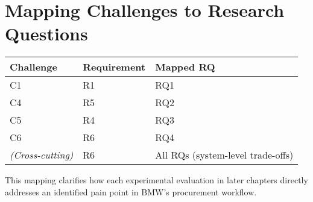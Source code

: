 \section{Mapping Challenges to Research Questions}
\begin{center}
\begin{tabular}{lll}
\textbf{Challenge} & \textbf{Requirement} & \textbf{Mapped RQ} \\\hline
C1 & R1 & RQ1  \\
C4 & R5 & RQ2  \\
C5 & R4 & RQ3  \\
C6 & R6 & RQ4  \\
\textit{(Cross-cutting)} & R6 & All RQs (system-level trade-offs) \\
\end{tabular}
\end{center}


This mapping clarifies how each experimental evaluation in later chapters directly addresses an identified pain point in BMW’s procurement workflow.
